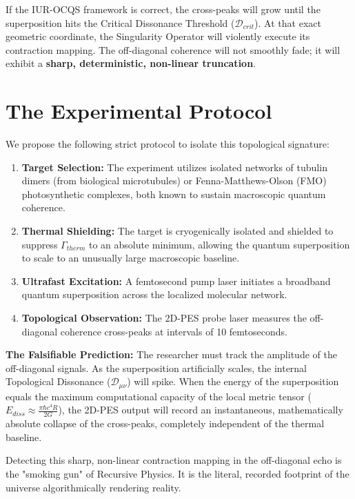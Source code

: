 \documentclass[12pt,openany]{book}
\begin{document}
If the IUR-OCQS framework is correct, the cross-peaks will grow until the superposition hits the Critical Dissonance Threshold ($\mathcal{D}_{crit}$). At that exact geometric coordinate, the Singularity Operator will violently execute its contraction mapping. The off-diagonal coherence will not smoothly fade; it will exhibit a \textbf{sharp, deterministic, non-linear truncation}. 

\section{The Experimental Protocol}
We propose the following strict protocol to isolate this topological signature:

\begin{enumerate}
    \item \textbf{Target Selection:} The experiment utilizes isolated networks of tubulin dimers (from biological microtubules) or Fenna-Matthews-Olson (FMO) photosynthetic complexes, both known to sustain macroscopic quantum coherence.
    \item \textbf{Thermal Shielding:} The target is cryogenically isolated and shielded to suppress $\Gamma_{therm}$ to an absolute minimum, allowing the quantum superposition to scale to an unusually large macroscopic baseline.
    \item \textbf{Ultrafast Excitation:} A femtosecond pump laser initiates a broadband quantum superposition across the localized molecular network.
    \item \textbf{Topological Observation:} The 2D-PES probe laser measures the off-diagonal coherence cross-peaks at intervals of 10 femtoseconds.
\end{enumerate}

\textbf{The Falsifiable Prediction:} The researcher must track the amplitude of the off-diagonal signals. As the superposition artificially scales, the internal Topological Dissonance ($\mathcal{D}_{\mu\nu}$) will spike. When the energy of the superposition equals the maximum computational capacity of the local metric tensor ($E_{diss} \approx \frac{\pi \hbar c^4 R}{2G}$), the 2D-PES output will record an instantaneous, mathematically absolute collapse of the cross-peaks, completely independent of the thermal baseline.

Detecting this sharp, non-linear contraction mapping in the off-diagonal echo is the "smoking gun" of Recursive Physics. It is the literal, recorded footprint of the universe algorithmically rendering reality.
\end{document}
